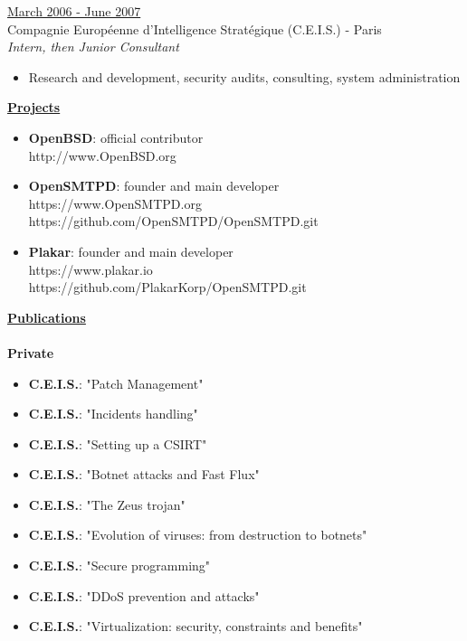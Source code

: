\documentclass[a4paper,10pt]{letter}
\begin{document}
\begin{description}
\item{\underline{March 2006 - June 2007}} \\
  Compagnie Europ\'eenne d'Intelligence Strat\'egique (C.E.I.S.) - Paris\\
  \textit{Intern, then Junior Consultant}
  \begin{itemize}
  \item Research and development, security audits, consulting, system administration\\
  \end{itemize}
\end{description}

\pagebreak

\underline{\textbf{Projects}}\\
\begin{itemize}
\item	\textbf{OpenBSD}: official contributor\\
  http://www.OpenBSD.org\\
\item	\textbf{OpenSMTPD}: founder and main developer\\
  https://www.OpenSMTPD.org\\
  https://github.com/OpenSMTPD/OpenSMTPD.git\\
  \item	\textbf{Plakar}: founder and main developer\\
  https://www.plakar.io\\
  https://github.com/PlakarKorp/OpenSMTPD.git\\
\end{itemize}

\underline{\textbf{Publications}}\\
\\
\textbf{Private}
\begin{itemize}
\item	\textbf{C.E.I.S.}: "Patch Management"
\item	\textbf{C.E.I.S.}: "Incidents handling"
\item	\textbf{C.E.I.S.}: "Setting up a CSIRT"
\item	\textbf{C.E.I.S.}: "Botnet attacks and Fast Flux"
\item	\textbf{C.E.I.S.}: "The Zeus trojan"
\item	\textbf{C.E.I.S.}: "Evolution of viruses: from destruction to botnets"
\item	\textbf{C.E.I.S.}: "Secure programming"
\item	\textbf{C.E.I.S.}: "DDoS prevention and attacks"
\item	\textbf{C.E.I.S.}: "Virtualization: security, constraints and benefits"\\
\end{itemize}
\end{document}
